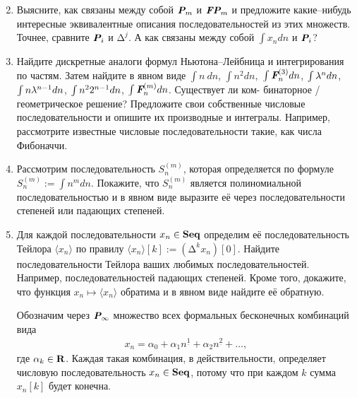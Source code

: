\begin{enumerate}
\setcounter{enumi}{1}
\item Выясните, как связаны между собой $\text{\bfseries\itshape P}_m$ и $\text{\bfseries\itshape FP}_m$ и предложите какие--нибудь интересные эквивалентные описания последовательностей из этих множеств. Точнее, сравните $\text{\bfseries\itshape P}_i$ и $\text{Δ}^{j}$. А как связаны между собой $\int x_n dn$ и $\text{\bfseries\itshape P}_i$? 
\item Найдите дискретные аналоги формул Ньютона--Лейбница и интегрирования по частям. Затем найдите в явном виде $\int n\ dn$, $\int n^2 dn,$
$\int \text{\bfseries\itshape F}_n^{(3)} dn$,
$\int {\rm \lambda}^n dn$,
$\int n {\rm \lambda}^{n-1} dn$,
$\int n^2 {\rm 2}^{n-1} dn$,
$\int \text{\bfseries\itshape F}_n^{(m)} dn$. Существует ли ком- бинаторное / геометрическое решение? Предложите свои собственные числовые последовательности и опишите их производные и интегралы. Например, рассмотрите известные числовые последовательности такие, как числа Фибоначчи.

\item Рассмотрим последовательность $S_n^{(m)}$, которая определяется по формуле $S_n^{(m)} := \int n^m dn$. Покажите, что $S_n^{(m)}$ является полиномиальной последовательностью и в явном виде выразите её через последовательности степеней или падающих степеней. 

\item Для каждой последовательности $x_n \in \text{\bf Seq}$ определим её последовательность Тейлора $\langle x_n \rangle$ по правилу $\langle x_n \rangle [k] := (\text{Δ}^k x_n)[0]$. Найдите последовательности Тейлора ваших любимых последовательностей. Например, последовательностей падающих степеней. Кроме того, докажите, что функция $x_n \mapsto \langle x_n \rangle$ обратима и в явном виде найдите её обратную.

Обозначим через $\text{\bfseries\itshape P}_\infty$ множество всех формальных бесконечных комбинаций вида
\begin{align*}
x_n = \alpha_0 + \alpha_1 n^{\underline{1}} + \alpha_2 n^{\underline{2}} + \ldots,
\end{align*}
где $\alpha_k \in \text{\bf R}$. Каждая такая комбинация, в действительности, определяет числовую последовательность $x_n \in \text{\bf Seq}$, потому что при каждом $k$ сумма $x_n[k]$ будет конечна.


\end{enumerate}
